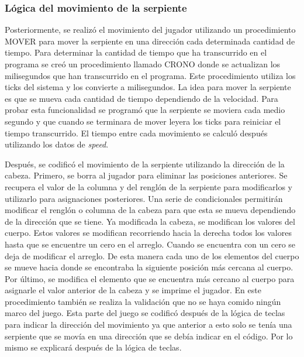 \documentclass[12pt]{article}
\begin{document}
\subsubsection*{Lógica del movimiento de la serpiente}
Posteriormente, se realizó el movimiento del jugador utilizando un procedimiento MOVER para mover la serpiente en una dirección cada determinada cantidad de tiempo. Para determinar la cantidad de tiempo que ha transcurrido en el programa se creó un procedimiento llamado CRONO donde se actualizan los milisegundos que han transcurrido en el programa. Este procedimiento utiliza los ticks del sistema y los convierte a milisegundos. La idea para mover la serpiente es que se mueva cada cantidad de tiempo dependiendo de la velocidad. Para probar esta funcionalidad se programó que la serpiente se moviera cada medio segundo y que cuando se terminara de mover leyera los ticks para reiniciar el tiempo transcurrido. El tiempo entre cada movimiento se calculó después utilizando los datos de \textit{speed}. 

Después, se codificó el movimiento de la serpiente utilizando la dirección de la cabeza. Primero, se borra al jugador para eliminar las posiciones anteriores. Se recupera el valor de la columna y del renglón de la serpiente para modificarlos y utilizarlo para asignaciones posteriores. Una serie de condicionales permitirán modificar el renglón o columna de la cabeza para que esta se mueva dependiendo de la dirección que se tiene. Ya modificada la cabeza, se modifican los valores del cuerpo. Estos valores se modifican recorriendo hacia la derecha todos los valores hasta que se encuentre un cero en el arreglo. Cuando se encuentra con un cero se deja de modificar el arreglo. De esta manera cada uno de los elementos del cuerpo se mueve hacia donde se encontraba la siguiente posición más cercana al cuerpo. Por último, se modifica el elemento que se encuentra más cercano al cuerpo para asignarle el valor anterior de la cabeza y se imprime el jugador. En este procedimiento también se realiza la validación que no se haya comido ningún marco del juego. Esta parte del juego se codificó después de la lógica de teclas para indicar la dirección del movimiento ya que anterior a esto solo se tenía una serpiente que se movía en una dirección que se debía indicar en el código. Por lo mismo se explicará después de la lógica de teclas.
\end{document}
